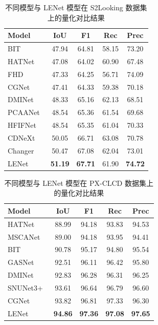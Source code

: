 \begin{table}[!htb]
  \centering
  \caption{不同模型与 LENet 模型在 S2Looking 数据集上的量化对比结果}
  \label{tab:lenet_s2looking}
  \begin{tabular}{lcccc}
    \toprule
    Model              &  IoU   &   F1   &   Rec   &  Prec  \\
    \midrule
    BIT~\cite{chen_remote_2022}       & 47.94  & 64.81  & 58.15   & 73.20  \\
    HATNet~\cite{Xu2024HybridAT}    & 47.08  & 64.02  & 60.90   & 67.48  \\
    FHD~\cite{pei_feature_2022}       & 47.33  & 64.25  & 56.71   & 74.09  \\
    CGNet~\cite{han_change_2023}     & 47.41  & 64.33  & 59.38   & 70.18  \\
    DMINet~\cite{feng_change_2023}    & 48.33  & 65.16  & 62.13   & 68.51  \\
    PCAANet~\cite{Xu2023ProgressiveCA}   & 48.54  & 65.36  & 61.54   & 69.68  \\
    HFIFNet~\cite{Han2025HFIFNetHF}   & 48.54  & 65.35  & 61.04   & 70.33  \\
    CDNeXt~\cite{wei_robust_2024}    & 50.05  & 66.71  & 63.08   & 70.78  \\
    Changer~\cite{Fang2022ChangerFI}   & 50.47  & 67.08  & 62.04   & 73.01  \\
    LENet              & \textbf{51.19} & \textbf{67.71} & 61.90 & \textbf{74.72} \\
    \bottomrule
  \end{tabular}
\end{table}


\begin{table}[!htb]
  \centering
  \caption{不同模型与 LENet 模型在 PX-CLCD 数据集上的量化对比结果}
  \label{tab:lenet_pxclcd}
  \begin{tabular}{lcccc}
    \toprule
    Model              &  IoU   &   F1   &   Rec   &  Prec  \\
    \midrule
    HATNet~\cite{Xu2024HybridAT}    & 88.99  & 94.18  & 93.83   & 94.53  \\
    MSCANet~\cite{m_liu_cnn-transformer_2022}   & 89.00  & 94.18  & 93.95   & 94.41  \\
    BIT~\cite{chen_remote_2022}      & 90.78  & 95.17  & 94.80   & 95.54  \\
    GASNet~\cite{zhang_global-aware_2023}    & 92.51  & 96.11  & 96.42   & 95.80  \\
    DMINet~\cite{feng_change_2023}    & 92.83  & 96.28  & 96.31   & 96.25  \\
    SNUNet3+~\cite{miao_snunet3_2024}  & 93.61  & 96.64  & 96.79   & 96.60  \\
    CGNet~\cite{han_change_2023}     & 93.82  & 96.81  & 97.33   & 96.30  \\
    LENet               & \textbf{94.86} & \textbf{97.36} & \textbf{97.08} & \textbf{97.65} \\
    \bottomrule
  \end{tabular}
\end{table}


